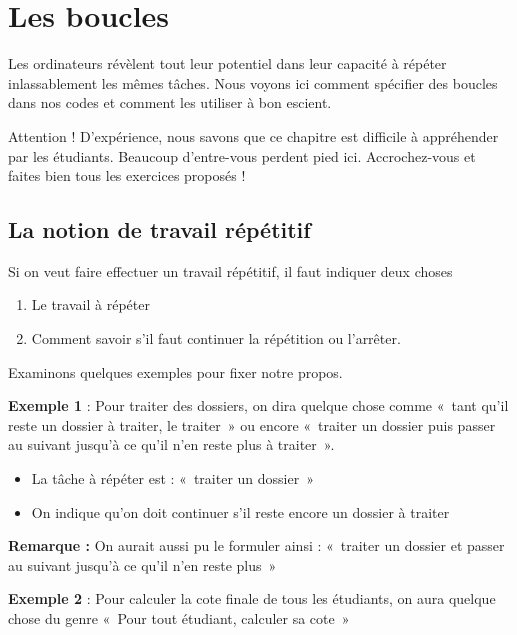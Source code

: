 \chapter{Les boucles}

	Les ordinateurs révèlent tout leur potentiel dans leur capacité à
	répéter inlassablement les mêmes tâches. Nous voyons ici comment
	spécifier des boucles dans nos codes et comment les utiliser à bon
	escient.

	Attention ! D'expérience, nous savons que ce chapitre
	est difficile à appréhender par les étudiants. Beaucoup
	d'entre-vous perdent pied ici. Accrochez-vous et
	faites bien tous les exercices proposés !


\section{La notion de travail répétitif}

	Si on veut faire effectuer un travail répétitif, 
	il faut indiquer deux choses
	
	\begin{enumerate}
	\item Le travail à répéter
	\item Comment savoir s'il faut continuer la répétition 
		ou l'arrêter.
	\end{enumerate}

	Examinons quelques exemples pour fixer notre propos.

	\textbf{Exemple 1} : Pour traiter des dossiers, on dira quelque chose
	comme «~tant qu'il reste un dossier à traiter, le
	traiter~» ou encore «~traiter un dossier puis passer au suivant
	jusqu'à ce qu'il
	n'en reste plus à traiter~».

	\begin{itemize}
	\item La tâche à répéter est : «~traiter un dossier~»
	\item On indique qu'on doit continuer s'il
		reste encore un dossier à traiter
	\end{itemize}

	\textbf{Remarque :} On aurait aussi pu le formuler ainsi : «~traiter un
	dossier et passer au suivant jusqu'à ce
	qu'il n'en reste plus~»

	\textbf{Exemple 2} : Pour calculer la cote finale de tous les étudiants,
	on aura quelque chose du genre «~Pour tout étudiant, calculer sa
	cote~»

